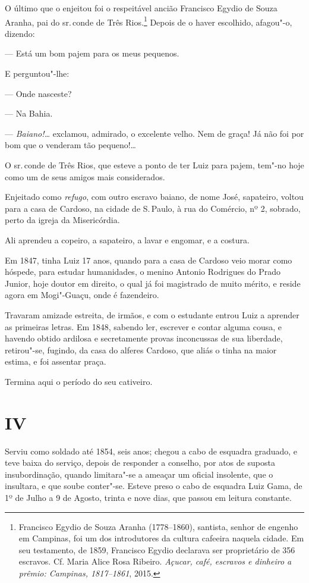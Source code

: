 O último que o enjeitou foi o respeitável ancião Francisco Egydio de
Souza Aranha, pai do sr.\,conde de Três Rios.\footnote{Francisco Egydio
  de Souza Aranha (1778--1860), santista, senhor de engenho em Campinas,
  foi um dos introdutores da cultura cafeeira naquela cidade. Em seu
  testamento, de 1859, Francisco Egydio declarava ser proprietário de
  356 escravos. Cf. Maria Alice Rosa Ribeiro. \emph{Açucar, café,
  escravos e dinheiro a prêmio: Campinas, 1817--1861}, 2015.} Depois de o
haver escolhido, afagou"-o, dizendo:

--- Está um bom pajem para os meus pequenos.

E perguntou"-lhe:

--- Onde nasceste?

--- Na Bahia.

--- \emph{Baiano!\ldots{}} exclamou, admirado, o excelente velho. Nem de
graça! Já não foi por bom que o venderam tão pequeno!\ldots{}

O sr.\,conde de Três Rios, que esteve a ponto de ter Luiz para pajem,
tem"-no hoje como um de seus amigos mais considerados.

Enjeitado como \emph{refugo}, com outro escravo baiano, de nome José,
sapateiro, voltou para a casa de Cardoso, na cidade de S.\,Paulo, à rua
do Comércio, nº 2, sobrado, perto da igreja da Misericórdia.

Ali aprendeu a copeiro, a sapateiro, a lavar e engomar, e a costura.

Em 1847, tinha Luiz 17 anos, quando para a casa de Cardoso veio morar
como hóspede, para estudar humanidades, o menino Antonio Rodrigues do
Prado Junior, hoje doutor em direito, o qual já foi magistrado de muito
mérito, e reside agora em Mogi"-Guaçu, onde é fazendeiro.

Travaram amizade estreita, de irmãos, e com o estudante entrou Luiz a
aprender as primeiras letras. Em 1848, sabendo ler, escrever e contar
alguma cousa, e havendo obtido ardilosa e secretamente provas
inconcussas de sua liberdade, retirou"-se, fugindo, da casa do alferes
Cardoso, que aliás o tinha na maior estima, e foi assentar praça.

Termina aqui o período do seu cativeiro.

\section*{IV}

Serviu como soldado até 1854, seis anos; chegou a cabo de esquadra
graduado, e teve baixa do serviço, depois de responder a conselho, por
atos de suposta insubordinação, quando limitara"-se a ameaçar um oficial
insolente, que o insultara, e que soube conter"-se. Esteve preso o cabo
de esquadra Luiz Gama, de 1º de Julho a 9 de Agosto, trinta e nove dias,
que passou em leitura constante.

